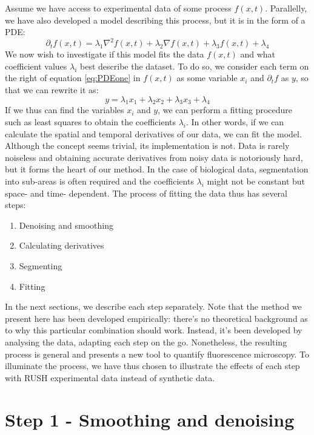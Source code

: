 \documentclass{Dissertate}
\providecommand{\tightlist}{%
  \setlength{\itemsep}{0pt}\setlength{\parskip}{0pt}}
\begin{document}
Assume we have access to experimental data of some process \(f(x,t)\).
Parallelly, we have also developed a model describing this process, but
it is in the form of a PDE: 
\begin{equation}
	\label{eq:PDEone}
	\partial_t f(x,t) = \lambda_1 \nabla^2f(x,t)+\lambda_2\nabla f(x,t) +\lambda_3 f(x,t) +\lambda_4
\end{equation} 
We now wish to investigate if this model fits the data \(f(x,t)\) and what coefficient values \(\lambda_i\) best describe the dataset.
To do so, we consider each term on the right of equation \ref{eq:PDEone} in \(f(x,t)\) as some variable \(x_i\) and \(\partial_t f\) as \(y\),
so that we can rewrite it as: \[
y = \lambda_1 x_1+\lambda_2x_2 +\lambda_3 x_3 +\lambda_4
\]
If we thus can find the variables \(x_i\) and \(y\), we can perform a
fitting procedure such as least squares to obtain the coefficients
\(\lambda_i\). In other words, if we can calculate the spatial and
temporal derivatives of our data, we can fit the model. Although the
concept seems trivial, its implementation is not. Data is rarely
noiseless and obtaining accurate derivatives from noisy data is
notoriously hard, but it forms the heart of our method. In the case of biological data, segmentation into sub-areas is often required and the coefficients \(\lambda_i\) might
not be constant but space- and time- dependent. The process of
fitting the data thus has several steps:

\begin{enumerate}
\def\labelenumi{\arabic{enumi}.}
\tightlist
\item
  Denoising and smoothing
\item
  Calculating derivatives
\item
  Segmenting
\item
  Fitting
\end{enumerate}

In the next sections, we describe each step separately. Note that the
method we present here has been developed empirically: there's no
theoretical background as to why this particular combination should work. Instead, it's been developed by analysing the data,
adapting each step on the go. Nonetheless, the resulting process is general and presents a new tool to quantify fluorescence microscopy. To illuminate the process, we have thus chosen to illustrate the effects of each step with RUSH experimental data instead of synthetic data.


\hypertarget{step-1---smoothing-and-denoising}{%
\section{Step 1 - Smoothing and
denoising}\label{step-1---smoothing-and-denoising}}
\end{document}
